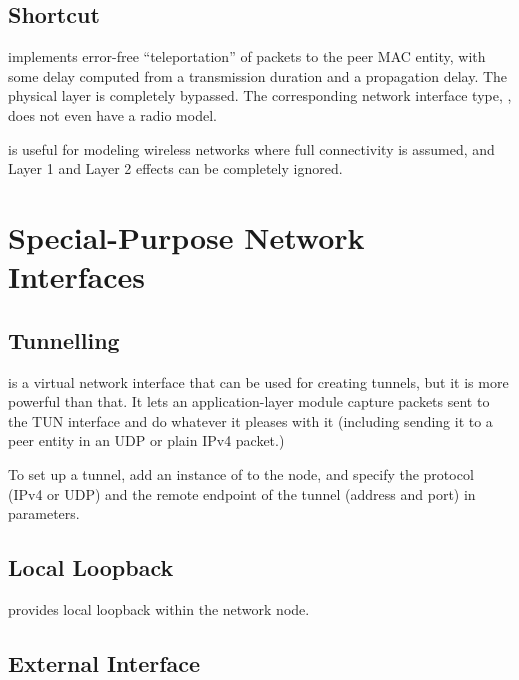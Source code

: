 \subsection{Shortcut}
\label{sec:interfaces:shortcut}

 implements error-free ``teleportation'' of packets
to the peer MAC entity, with some delay computed from a transmission
duration and a propagation delay. The physical layer is completely bypassed.
The corresponding network interface type, ,
does not even have a radio model.

 is useful for modeling wireless networks
where full connectivity is assumed, and Layer 1 and Layer 2 effects
can be completely ignored.

\section{Special-Purpose Network Interfaces}
\label{sec:interfaces:special-purpose-network-interfaces}


\subsection{Tunnelling}
\label{sec:interfaces:tunnelling}

 is a virtual network interface that can be used
for creating tunnels, but it is more powerful than that.
It lets an application-layer module capture packets sent to
the TUN interface and do whatever it pleases with it (including
sending it to a peer entity in an UDP or plain IPv4 packet.)

To set up a tunnel, add an instance of  to
the node, and specify the protocol (IPv4 or UDP) and the remote
endpoint of the tunnel (address and port) in parameters.

\subsection{Local Loopback}
\label{sec:interfaces:local-loopback}

 provides local loopback within the network node.

\subsection{External Interface}
\label{sec:interfaces:external-interface}

